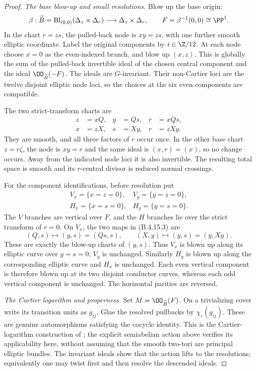 \begin{proof}
\emph{The base blow-up and small resolutions.}
Blow up the base origin:
\[
 \beta:\widetilde B=\operatorname{Bl}_{(0,0)}
            (\Delta_z\times\Delta_r)
       \longrightarrow\Delta_z\times\Delta_r,
 \qquad F=\beta^{-1}(0,0)\cong\PP^1.
\]
In the chart $r=zs$, the pulled-back node is
$xy=zs$, with one further smooth elliptic coordinate.
Label the original components by $i\in\Z/12$.
At each node choose $x=0$ as the even-indexed branch,
and blow up $(x,z)$. This is globally the sum of the
pulled-back invertible ideal of the chosen central
component and the ideal $\OO_{\widetilde B}(-F)$.
The ideals are $G$-invariant. Their non-Cartier loci are
the twelve disjoint elliptic node loci, so the choices
at the six even components are compatible.

The two strict-transform charts are
\[
 \begin{aligned}
 z&=xQ,&y&=Qs,&r&=xQs,\\
 x&=zX,&s&=Xy,&r&=zXy.
 \end{aligned}
 \tag{B.4.15.3}
\]
They are smooth, and all three factors of $r$ occur once.
In the other base chart $z=r\zeta$, the node is $xy=r$
and the same ideal is $(x,r)=(x)$, so no change occurs.
Away from the indicated node loci it is also invertible.
The resulting total space is smooth and its $r$-central
divisor is reduced normal crossings.

For the component identifications, before resolution put
\[
 \begin{array}{ll}
 V_x=\{x=z=0\},&V_y=\{y=z=0\},\\
 H_x=\{x=s=0\},&H_y=\{y=s=0\}.
 \end{array}
\]
The $V$ branches are vertical over $F$, and the $H$
branches lie over the strict transform of $r=0$.
On $V_x$, the two maps in (B.4.15.3) are
\[
 (Q,s)\longmapsto(y,s)=(Qs,s),\qquad
 (X,y)\longmapsto(y,s)=(y,Xy).
\]
These are exactly the blow-up charts of $(y,s)$.
Thus $V_x$ is blown up along its elliptic curve over
$y=s=0$; $V_y$ is unchanged. Similarly $H_y$ is blown
up along the corresponding elliptic curve and $H_x$
is unchanged. Each even vertical component is therefore
blown up at its two disjoint conductor curves, whereas
each odd vertical component is unchanged. The horizontal
parities are reversed.

\emph{The Cartier logarithm and properness.}
Set $M=\OO_{\widetilde B}(F)$. On a trivializing cover
write its transition units as $g_{ij}$. Glue the resolved
pullbacks by $\chi_z(g_{ij})$. These are genuine
automorphisms satisfying the cocycle identity.
This is the Cartier-logarithm construction of
\citet[Definition~1.1]{Fujimoto1990AB}; the explicit
semiabelian action above verifies its applicability
here, without assuming that the smooth two-tori are
principal elliptic bundles. The invariant ideals show
that the action lifts to the resolutions; equivalently
one may twist first and then resolve the descended ideals.


\end{proof}
